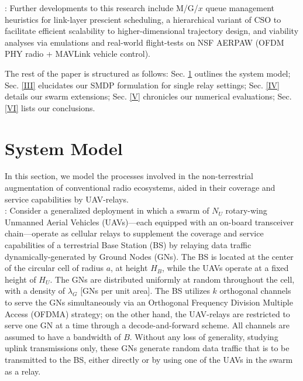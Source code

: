 \documentclass[10pt,twocolumn]{IEEEtran}
\begin{document}
: Further developments to this research include M/G/$x$ queue management heuristics for link-layer prescient scheduling, a hierarchical variant of CSO to facilitate efficient scalability to higher-dimensional trajectory design, and viability analyses via emulations and real-world flight-tests on NSF AERPAW (OFDM PHY radio + MAVLink vehicle control).

The rest of the paper is structured as follows: Sec. \ref{II} outlines the system model; Sec. \ref{III} elucidates our SMDP formulation for single relay settings; Sec. \ref{IV} details our swarm extensions; Sec. \ref{V} chronicles our numerical evaluations; Sec. \ref{VI} lists our conclusions.

\vspace{-8mm}
\section{System Model}\label{II}
In this section, we model the processes involved in the non-terrestrial augmentation of conventional radio ecosystems, aided in their coverage and service capabilities by UAV-relays.\\
: Consider a generalized deployment in which a swarm of $N_{U}$ rotary-wing Unmanned Aerial Vehicles (UAVs)---each equipped with an on-board transceiver chain---operate as cellular relays to supplement the coverage and service capabilities of a terrestrial Base Station (BS) by relaying data traffic dynamically-generated by Ground Nodes (GNs). The BS is located at the center of the circular cell of radius $a$, at height $H_{B}$, while the UAVs operate at a fixed height of $H_{U}$. The GNs are distributed uniformly at random throughout the cell, with a density of $\lambda_{G}$ [GNs per unit area]. The BS utilizes $k$ orthogonal channels to serve the GNs simultaneously via an Orthogonal Frequency Division Multiple Access (OFDMA) strategy; on the other hand, the UAV-relays are restricted to serve one GN at a time through a decode-and-forward scheme. All channels are assumed to have a bandwidth of $B$. Without any loss of generality, studying uplink transmissions only, these GNs generate random data traffic that is to be transmitted to the BS, either directly or by using one of the UAVs in the swarm as a relay.\\
\end{document}
